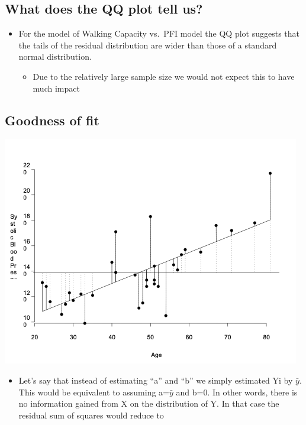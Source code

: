 \documentclass[
]{book}
\providecommand{\tightlist}{%
  \setlength{\itemsep}{0pt}\setlength{\parskip}{0pt}}
\begin{document}
\hypertarget{what-does-the-qq-plot-tell-us}{%
\subsection{What does the QQ plot tell us?}\label{what-does-the-qq-plot-tell-us}}

\begin{itemize}
\tightlist
\item
  For the model of Walking Capacity vs.~PFI model the QQ plot suggests that the tails of the residual distribution are wider than those of a standard normal distribution.

  \begin{itemize}
  \tightlist
  \item
    Due to the relatively large sample size we would not expect this to have much impact
  \end{itemize}
\end{itemize}

\hypertarget{goodness-of-fit}{%
\subsection{Goodness of fit}\label{goodness-of-fit}}

\includegraphics[width=1\linewidth]{./12_53}

\begin{itemize}
\tightlist
\item
  Let's say that instead of estimating ``a'' and ``b'' we simply estimated Yi by \(\bar y\). This would be equivalent to assuming a=\(\bar y\) and b=0. In other words, there is no information gained from X on the distribution of Y. In that case the residual sum of squares would reduce to
\end{itemize}
\end{document}
